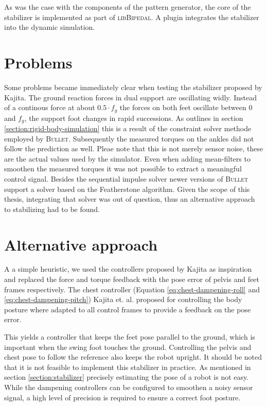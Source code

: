 \documentclass[english,ngerman]{KITreprt}
\newcommand{\name}[1]{\textsc{#1}}
\begin{document}
As was the case with the components of the pattern generator, the core
of the stabilizer is implemented as part of \name{libBipedal}. A plugin
integrates the stabilizer into the dynamic simulation.

\section{Problems}\label{problems}

Some problems became immediately clear when testing the stabilizer
proposed by Kajita. The ground reaction forces in dual support are
oscillating widly. Instead of a continous force at about $0.5 \cdot f_g$
the forces on both feet oscillate between $0$ and $f_g$, the support
foot changes in rapid successions. As outlines in section
\ref{section:rigid-body-simulation} this is a result of the constraint
solver methode employed by \name{Bullet}. Subsequently the measured
torques on the ankles did not follow the prediction as well. Pleae note
that this is not merely sensor noise, these are the actual values used
by the simulator. Even when adding mean-filters to smoothen the measured
torques it was not possible to extract a meaningful control signal.
Besides the sequential impulse solver newer versions of \name{Bullet}
support a solver based on the Featherstone algorithm. Given the scope of
this thesis, integrating that solver was out of question, thus an
alternative approach to stabilizing had to be found.

\section{Alternative approach}\label{section:alternative-approach}

A a simple heuristic, we used the controllers proposed by Kajita as
inspiration and replaced the force and torque feedback with the pose
error of pelvis and feet frames respectively. The chest controller
(Equation \ref{eq:chest-dampening-roll} and
\ref{eq:chest-dampening-pitch}) Kajita et. al. proposed for controlling
the body posture where adapted to all control frames to provide a
feedback on the pose error.

This yields a controller that keeps the feet pose parallel to the
ground, which is important when the swing foot touches the ground.
Controlling the pelvis and chest pose to follow the reference also keeps
the robot upright. It should be noted that it is not feasible to
implement this stabilizer in practice. As mentioned in section
\ref{section:stabilizer} precisely estimating the pose of a robot is not
easy. While the dampening controllers can be configured to smoothen a
noisy sensor signal, a high level of precision is required to ensure a
correct foot posture.
\end{document}
